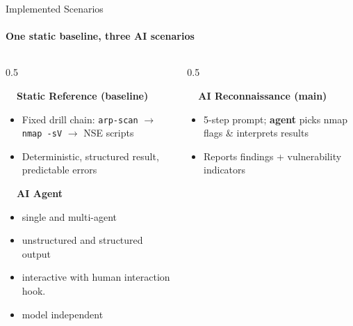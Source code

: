 \begin{frame}{Implemented Scenarios}
    \framesubtitle{One static baseline, three AI scenarios}

    \begin{columns}[T,onlytextwidth]
        \begin{column}{0.5\textwidth}
             {
                \textbf{\faClipboardCheck~~Static Reference (baseline)}
                \begin{itemize}
                    \item \scriptsize Fixed drill chain: \texttt{arp-scan} $\rightarrow$ \texttt{nmap -sV} $\rightarrow$ NSE scripts
                    \item \scriptsize Deterministic, structured result, predictable errors
                \end{itemize}
            }

            \vspace{0.6em}
             {
                \textbf{\faRobot~~AI Agent}
                \begin{itemize}
                    \item \scriptsize single and multi-agent
                    \item \scriptsize unstructured and structured output
                    \item \scriptsize interactive with human interaction hook.
                    \item \scriptsize model independent
                \end{itemize}
            }
        \end{column}

        \begin{column}{0.5\textwidth}
             {
                \textbf{\faSearch~~AI Reconnaissance \scriptsize (main)}
                \begin{itemize}
                    \item \scriptsize 5-step prompt; \textbf{agent} picks nmap flags \& interprets results
                    \item \scriptsize Reports findings + vulnerability indicators
                \end{itemize}
            }
        \end{column}
    \end{columns}
\end{frame}



